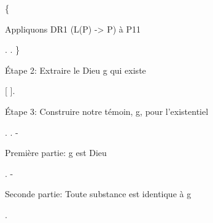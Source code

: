 \documentclass[10pt]{report}
\begin{document}
\begin{coqdoccode}
\coqdocindent{1.00em}
\{\coqdoceol
\coqdocindent{2.00em}
\begin{coqdoccomment}
\coqdocindent{0.50em}
Appliquons\coqdocindent{0.50em}
DR1\coqdocindent{0.50em}
(L(P)\coqdocindent{0.50em}
->\coqdocindent{0.50em}
P)\coqdocindent{0.50em}
à\coqdocindent{0.50em}
P11\coqdocindent{0.50em}
\end{coqdoccomment}
\coqdoceol
\coqdocindent{2.00em}
 .\coqdoceol
\coqdocindent{2.00em}
 .\coqdoceol
\coqdocindent{1.00em}
\}\coqdoceol
\coqdocindent{1.00em}
\coqdoceol
\coqdocindent{1.00em}
\begin{coqdoccomment}
\coqdocindent{0.50em}
Étape\coqdocindent{0.50em}
2:\coqdocindent{0.50em}
Extraire\coqdocindent{0.50em}
le\coqdocindent{0.50em}
Dieu\coqdocindent{0.50em}
g\coqdocindent{0.50em}
qui\coqdocindent{0.50em}
existe\coqdocindent{0.50em}
\end{coqdoccomment}
\coqdoceol
\coqdocindent{1.00em}
   [ ].\coqdoceol
\coqdocemptyline
\coqdocindent{1.00em}
\begin{coqdoccomment}
\coqdocindent{0.50em}
Étape\coqdocindent{0.50em}
3:\coqdocindent{0.50em}
Construire\coqdocindent{0.50em}
notre\coqdocindent{0.50em}
témoin,\coqdocindent{0.50em}
g,\coqdocindent{0.50em}
pour\coqdocindent{0.50em}
l'existentiel\coqdocindent{0.50em}
\end{coqdoccomment}
\coqdoceol
\coqdocindent{1.00em}
\coqdoctac{\ensuremath{\exists}} .\coqdoceol
\coqdocindent{1.00em}
.\coqdoceol
\coqdocindent{1.00em}
- \begin{coqdoccomment}
\coqdocindent{0.50em}
Première\coqdocindent{0.50em}
partie:\coqdocindent{0.50em}
g\coqdocindent{0.50em}
est\coqdocindent{0.50em}
Dieu\coqdocindent{0.50em}
\end{coqdoccomment}
\coqdoceol
\coqdocindent{2.00em}
 .\coqdoceol
\coqdocemptyline
\coqdocindent{1.00em}
- \begin{coqdoccomment}
\coqdocindent{0.50em}
Seconde\coqdocindent{0.50em}
partie:\coqdocindent{0.50em}
Toute\coqdocindent{0.50em}
substance\coqdocindent{0.50em}
est\coqdocindent{0.50em}
identique\coqdocindent{0.50em}
à\coqdocindent{0.50em}
g\coqdocindent{0.50em}
\end{coqdoccomment}
\coqdoceol
\coqdocindent{2.00em}
  .\coqdoceol
\coqdocemptyline
\coqdocindent{2.00em}

\end{coqdoccode}
\end{document}
